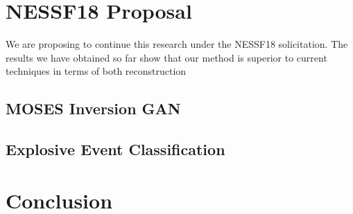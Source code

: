 \documentclass[10pt,letterpaper, doublespace]{article}
\begin{document}
	\section{NESSF18 Proposal}
	
		We are proposing to continue this research under the NESSF18 solicitation.
		The results we have obtained so far show that our method is superior to current techniques in terms of both reconstruction 
	
		\subsection{MOSES Inversion GAN} \label{sec_gan}
		
		
		\subsection{Explosive Event Classification}
		

	
	\section{Conclusion}
	
	
	
	
\end{document}
